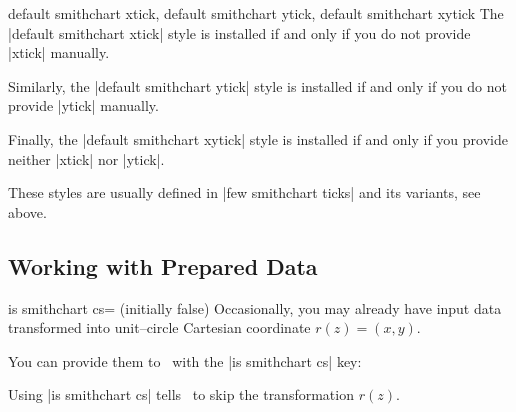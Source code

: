 \begin{pgfplotskeylist}{%
	default smithchart xtick,%
	default smithchart ytick,%
	default smithchart xytick}
	The |default smithchart xtick| style is installed if and only if you do not provide |xtick| manually.

	Similarly, the |default smithchart ytick| style is installed if and only if you do not provide |ytick| manually.

	Finally, the |default smithchart xytick| style is installed if and only if you provide neither |xtick| nor |ytick|.

	These styles are usually defined in |few smithchart ticks| and its variants, see above.
\end{pgfplotskeylist}

\subsection{Working with Prepared Data}
\begin{pgfplotskey}{is smithchart cs= (initially false)}
	Occasionally, you may already have input data transformed into unit--circle Cartesian coordinate $r(z) = (x,y)$.

	You can provide them to \PGFPlots\ with the |is smithchart cs| key:
\begin{codeexample}[]
\end{codeexample}
	Using |is smithchart cs| tells \PGFPlots\ to skip the transformation $r(z)$.
\end{pgfplotskey}

